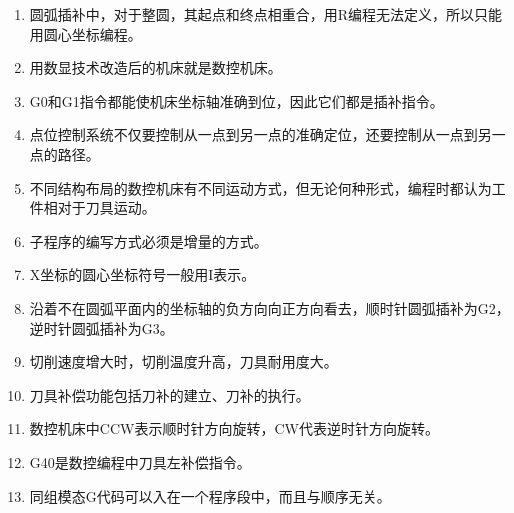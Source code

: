 \documentclass[12pt,twocolumn,landscape,UTF8,twoside]{ctexart}
\begin{document}
\begin{spacing}{1.3}
\begin{enumerate} [1、]
\item 圆弧插补中，对于整圆，其起点和终点相重合，用R编程无法定义，所以只能用圆心坐标编程。
\item 用数显技术改造后的机床就是数控机床。
\item G0和G1指令都能使机床坐标轴准确到位，因此它们都是插补指令。
\item 点位控制系统不仅要控制从一点到另一点的准确定位，还要控制从一点到另一点的路径。
\item 不同结构布局的数控机床有不同运动方式，但无论何种形式，编程时都认为工件相对于刀具运动。
\item 子程序的编写方式必须是增量的方式。
\item X坐标的圆心坐标符号一般用I表示。
\item 沿着不在圆弧平面内的坐标轴的负方向向正方向看去，顺时针圆弧插补为G2，逆时针圆弧插补为G3。
\item 切削速度增大时，切削温度升高，刀具耐用度大。
\item 刀具补偿功能包括刀补的建立、刀补的执行。
\item 数控机床中CCW表示顺时针方向旋转，CW代表逆时针方向旋转。
\item G40是数控编程中刀具左补偿指令。
\item 同组模态G代码可以入在一个程序段中，而且与顺序无关。

\end{enumerate}
\end{spacing}
\end{document}
